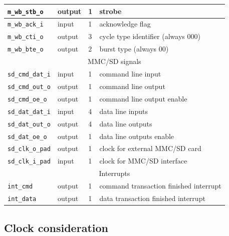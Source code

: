 \begin{table}
\begin{center}
\begin{tabular}{l|l|l|l}
                    \texttt{m\_wb\_stb\_o} & output & 1 & strobe \\ \hline
                    \texttt{m\_wb\_ack\_i} & input & 1 & acknowledge flag \\ \hline
                    \texttt{m\_wb\_cti\_o} & output & 3 & cycle type identifier (always 000) \\ \hline
                    \texttt{m\_wb\_bte\_o} & output & 2 & burst type (always 00) \\ \hline
                    \multicolumn{4}{c}{MMC/SD signals} \\ \hline
                    \texttt{sd\_cmd\_dat\_i} & input & 1 & command line input \\ \hline
                    \texttt{sd\_cmd\_out\_o} & output & 1 & command line output \\ \hline
                    \texttt{sd\_cmd\_oe\_o} & output & 1 & command line output enable \\ \hline
                    \texttt{sd\_dat\_dat\_i} & input & 4 & data line inputs \\ \hline
                    \texttt{sd\_dat\_out\_o} & output & 4 & data line outputs \\ \hline
                    \texttt{sd\_dat\_oe\_o} & output & 1 & data line outputs enable \\ \hline
                    \texttt{sd\_clk\_o\_pad} & output & 1 & clock for external MMC/SD card \\ \hline
                    \texttt{sd\_clk\_i\_pad} & input & 1 & clock for MMC/SD interface \\ \hline
                    \multicolumn{4}{c}{Interrupts} \\ \hline
                    \texttt{int\_cmd} & output & 1 & command transaction finished interrupt \\ \hline
                    \texttt{int\_data} & output & 1 & data transaction finished interrupt \\ \hline
                    \hline
            \end{tabular}
            \label{tab:signals}
        \end{center}
    \end{table}     
    
    \subsection{Clock consideration}
    \label{sec:clock}
    
